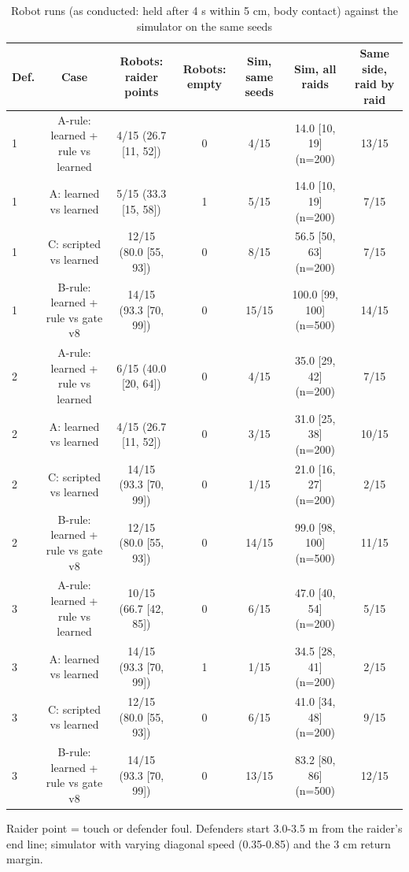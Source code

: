 \begin{table}[t]
\centering
\caption{Robot runs (as conducted: held after 4 s within 5 cm, body contact) against the simulator on the same seeds}
\label{tab:T5_robot_runs}
\begin{tabular}{lcccccc}
\toprule
Def. & Case & Robots: raider points & Robots: empty & Sim, same seeds & Sim, all raids & Same side, raid by raid \\
\midrule
1 & A-rule: learned + rule vs learned & 4/15 (26.7 [11, 52]) & 0 & 4/15 & 14.0 [10, 19] (n=200) & 13/15 \\
1 & A: learned vs learned & 5/15 (33.3 [15, 58]) & 1 & 5/15 & 14.0 [10, 19] (n=200) & 7/15 \\
1 & C: scripted vs learned & 12/15 (80.0 [55, 93]) & 0 & 8/15 & 56.5 [50, 63] (n=200) & 7/15 \\
1 & B-rule: learned + rule vs gate v8 & 14/15 (93.3 [70, 99]) & 0 & 15/15 & 100.0 [99, 100] (n=500) & 14/15 \\
2 & A-rule: learned + rule vs learned & 6/15 (40.0 [20, 64]) & 0 & 4/15 & 35.0 [29, 42] (n=200) & 7/15 \\
2 & A: learned vs learned & 4/15 (26.7 [11, 52]) & 0 & 3/15 & 31.0 [25, 38] (n=200) & 10/15 \\
2 & C: scripted vs learned & 14/15 (93.3 [70, 99]) & 0 & 1/15 & 21.0 [16, 27] (n=200) & 2/15 \\
2 & B-rule: learned + rule vs gate v8 & 12/15 (80.0 [55, 93]) & 0 & 14/15 & 99.0 [98, 100] (n=500) & 11/15 \\
3 & A-rule: learned + rule vs learned & 10/15 (66.7 [42, 85]) & 0 & 6/15 & 47.0 [40, 54] (n=200) & 5/15 \\
3 & A: learned vs learned & 14/15 (93.3 [70, 99]) & 1 & 1/15 & 34.5 [28, 41] (n=200) & 2/15 \\
3 & C: scripted vs learned & 12/15 (80.0 [55, 93]) & 0 & 6/15 & 41.0 [34, 48] (n=200) & 9/15 \\
3 & B-rule: learned + rule vs gate v8 & 14/15 (93.3 [70, 99]) & 0 & 13/15 & 83.2 [80, 86] (n=500) & 12/15 \\
\bottomrule
\end{tabular}
\par\smallskip\footnotesize Raider point = touch or defender foul. Defenders start 3.0-3.5 m from the raider's end line; simulator with varying diagonal speed (0.35-0.85) and the 3 cm return margin.
\end{table}
